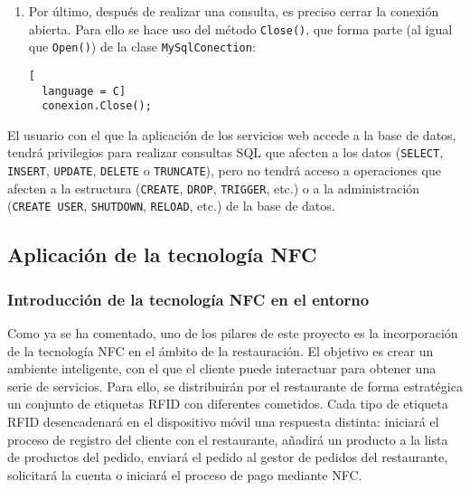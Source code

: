 \begin{enumerate}
\begin{itemize}
\item Por otro lado, si la consulta no va a devolver ningún resultado, es
decir, si la consulta es del tipo: \texttt{INSERT}, \texttt{UPDATE},
\texttt{DELETE}, \texttt{TRUNCATE}, etc.; se utilizará el método
\texttt{ExecuteNonQuery()}:

\begin{lstlisting}[
  language = C]
  comando.ExecuteNonQuery();
\end{lstlisting}

La consulta tendrá efecto en la base de datos pero no devolverá ningún
resultado.
\end{itemize}

\item Por último, después de realizar una consulta, es preciso cerrar la
conexión abierta. Para ello se hace uso del método \texttt{Close()}, que forma
parte (al igual que \texttt{Open()}) de la clase \texttt{MySqlConection}:

\begin{lstlisting}[
  language = C]
  conexion.Close();
\end{lstlisting}
\end{enumerate}

El usuario con el que la aplicación de los servicios web accede a la base
de datos, tendrá privilegios para realizar consultas \acs{SQL} que afecten
a los datos (\texttt{SELECT}, \texttt{INSERT}, \texttt{UPDATE},
\texttt{DELETE} o \texttt{TRUNCATE}), pero no tendrá acceso a operaciones
que afecten a la estructura  (\texttt{CREATE}, \texttt{DROP}, \texttt{TRIGGER},
etc.) o a la administración (\texttt{CREATE USER}, \texttt{SHUTDOWN},
\texttt{RELOAD}, etc.) de la base de datos.

  \subsection{Aplicación de la tecnología \acs{NFC}}
    \subsubsection{Introducción de la tecnología \acs{NFC} en el entorno}
Como ya se ha comentado, uno de los pilares de este proyecto es la
incorporación de la tecnología \acs{NFC} en el ámbito de la restauración.
El objetivo es crear un ambiente inteligente, con el que el cliente puede 
interactuar para obtener una serie de servicios. Para ello, se distribuirán 
por el restaurante de forma estratégica un conjunto de etiquetas \acs{RFID} 
con diferentes cometidos. Cada tipo de etiqueta \acs{RFID} desencadenará en el 
dispositivo móvil una respuesta distinta: iniciará el proceso de registro del 
cliente con el restaurante, añadirá un producto a la lista de productos del 
pedido, enviará el pedido al gestor de pedidos del restaurante, solicitará la 
cuenta o iniciará el proceso de pago mediante \acs{NFC}.

